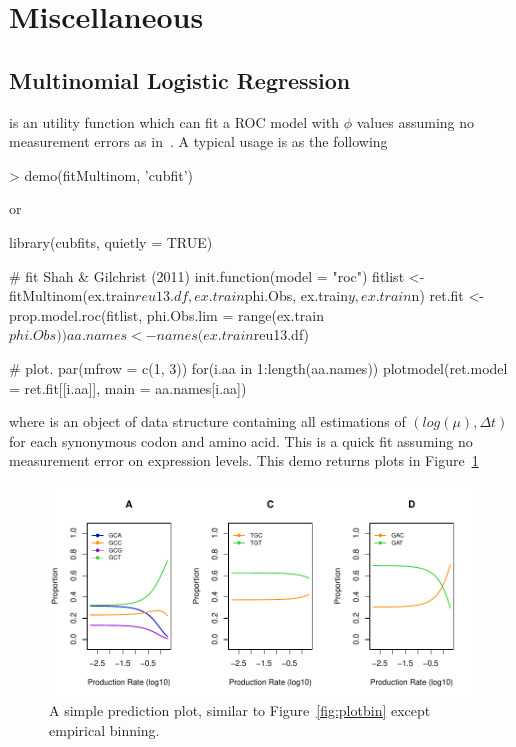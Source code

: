 
\section[Miscellaneous]{Miscellaneous}
\label{sec:misc}


\subsection[Multinomial Logistic Regression]{Multinomial Logistic Regression}
\label{sec:multinom}

 is an utility function which can fit a ROC model with
$\phi$ values assuming no measurement errors as in~\cite{Shah2011}.
A typical usage is as the following
\begin{Code}
> demo(fitMultinom, 'cubfit')
\end{Code}
or
\begin{Code}
library(cubfits, quietly = TRUE)

# fit Shah & Gilchrist (2011)
init.function(model = "roc")
fitlist <- fitMultinom(ex.train$reu13.df, ex.train$phi.Obs,
                       ex.train$y, ex.train$n)
ret.fit <- prop.model.roc(fitlist, phi.Obs.lim = range(ex.train$phi.Obs))
aa.names <- names(ex.train$reu13.df)

# plot.
par(mfrow = c(1, 3))
for(i.aa in 1:length(aa.names)){
  plotmodel(ret.model = ret.fit[[i.aa]], main = aa.names[i.aa])
}
\end{Code}
where  is an object of  data structure containing
all estimations of $(log(\mu), \Delta t)$ for each synonymous codon and
amino acid.
This is a quick fit assuming no measurement error on expression levels.
This demo returns plots in Figure~\ref{fig:fitMultinom}
\begin{figure}[ht]
\centering
\includegraphics[width=6in]{cubfits-include/figure/fitMultinom}
\caption{A simple prediction plot, similar to Figure~\ref{fig:plotbin}
except empirical binning.
}
\label{fig:fitMultinom}
\end{figure}

